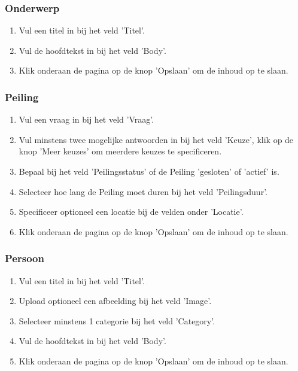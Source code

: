 \subsubsection{Onderwerp}\label{onderwerp}

\begin{enumerate}
\item Vul een titel in bij het veld 'Titel'.
\item Vul de hoofdtekst in bij het veld 'Body'.
\item Klik onderaan de pagina op de knop 'Opslaan' om de inhoud op te slaan.
\end{enumerate}

\subsubsection{Peiling}\label{peiling}

\begin{enumerate}
\item Vul een vraag in bij het veld 'Vraag'.
\item Vul minstens twee mogelijke antwoorden in bij het veld 'Keuze', klik op de knop 'Meer keuzes' om meerdere keuzes te specificeren.
\item Bepaal bij het veld 'Peilingsstatus' of de Peiling 'gesloten' of 'actief' is.
\item Selecteer hoe lang de Peiling moet duren bij het veld 'Peilingsduur'.
\item Specificeer optioneel een locatie bij de velden onder 'Locatie'.
\item Klik onderaan de pagina op de knop 'Opslaan' om de inhoud op te slaan.
\end{enumerate}

\subsubsection{Persoon}\label{persoon}

\begin{enumerate}
\item Vul een titel in bij het veld 'Titel'.
\item Upload optioneel een afbeelding bij het veld 'Image'.
\item Selecteer minstens 1 categorie bij het veld 'Category'.
\item Vul de hoofdtekst in bij het veld 'Body'.
\item Klik onderaan de pagina op de knop 'Opslaan' om de inhoud op te slaan.
\end{enumerate}


